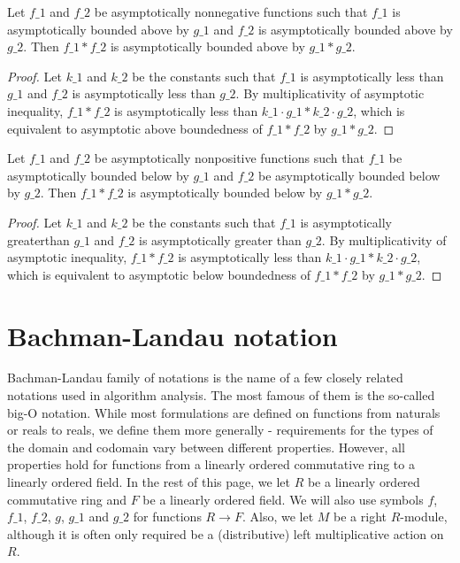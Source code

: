 \begin{lemma}
    \label{lemma:asymp_bounded_above_nonneg_mul}
    \leanok
    Let $f\_1$ and $f\_2$ be asymptotically nonnegative functions such that $f\_1$ 
    is asymptotically bounded above by $g\_1$ and $f\_2$ is asymptotically bounded 
    above by $g\_2$. Then $f\_1 * f\_2$ is asymptotically bounded above by $g\_1 * g\_2$.
\end{lemma}

\begin{proof}
    \leanok
    Let $k\_1$ and $k\_2$ be the constants such that $f\_1$ is asymptotically less than
    $g\_1$ and $f\_2$ is asymptotically less than $g\_2$. By multiplicativity of asymptotic 
    inequality, $f\_1 * f\_2$ is asymptotically less than $k\_1 \cdot g\_1 * k\_2 \cdot g\_2$,
    which is equivalent to asymptotic above boundedness of $f\_1 * f\_2$ by $g\_1 * g\_2$.
\end{proof}

\begin{lemma}
    \label{lemma:asymp_bounded_below_nonpos_mul}
    \leanok
    Let $f\_1$ and $f\_2$ be asymptotically nonpositive functions such that $f\_1$ 
    be asymptotically bounded below by $g\_1$ and $f\_2$ be asymptotically bounded 
    below by $g\_2$. Then $f\_1 * f\_2$ is asymptotically bounded below by $g\_1 * g\_2$.
\end{lemma}

\begin{proof}
    \leanok
    Let $k\_1$ and $k\_2$ be the constants such that $f\_1$ is asymptotically greaterthan
    $g\_1$ and $f\_2$ is asymptotically greater than $g\_2$. By multiplicativity of asymptotic 
    inequality, $f\_1 * f\_2$ is asymptotically less than $k\_1 \cdot g\_1 * k\_2 \cdot g\_2$,
    which is equivalent to asymptotic below boundedness of $f\_1 * f\_2$ by $g\_1 * g\_2$.
\end{proof}


\section{Bachman-Landau notation}

Bachman-Landau family of notations is the name of a few closely related notations used in 
algorithm analysis. The most famous of them is the so-called big-O notation. While
most formulations are defined on functions from naturals or reals to reals, we define 
them more generally - requirements for the types of the domain and codomain vary between 
different properties. However, all properties hold for functions from a linearly ordered 
commutative ring to a linearly ordered field. In the rest of this page, we let $R$ be a linearly 
ordered commutative ring and $F$ be a linearly ordered field. We will also use symbols $f$, 
$f\_1$, $f\_2$, $g$, $g\_1$ and $g\_2$ for functions $R \to F$. Also, we let $M$ be 
a right $R$-module, although it is often only required be a (distributive) left multiplicative 
action on $R$.


